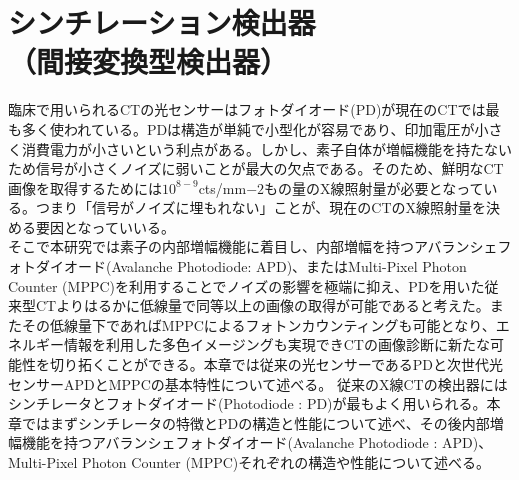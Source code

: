 \chapter{シンチレーション検出器\\（間接変換型検出器）}
臨床で用いられるCTの光センサーはフォトダイオード(PD)が現在のCTでは最も多く使われている。PDは構造が単純で小型化が容易であり、印加電圧が小さく消費電力が小さいという利点がある。しかし、素子自体が増幅機能を持たないため信号が小さくノイズに弱いことが最大の欠点である。そのため、鮮明なCT画像を取得するためには$10^{8-9}$cts/mm$-2$もの量のX線照射量が必要となっている。つまり「信号がノイズに埋もれない」ことが、現在のCTのX線照射量を決める要因となっていいる。\\
そこで本研究では素子の内部増幅機能に着目し、内部増幅を持つアバランシェフォトダイオード(Avalanche Photodiode: APD)、またはMulti-Pixel Photon Counter (MPPC)を利用することでノイズの影響を極端に抑え、PDを用いた従来型CTよりはるかに低線量で同等以上の画像の取得が可能であると考えた。またその低線量下であればMPPCによるフォトンカウンティングも可能となり、エネルギー情報を利用した多色イメージングも実現できCTの画像診断に新たな可能性を切り拓くことができる。本章では従来の光センサーであるPDと次世代光センサーAPDとMPPCの基本特性について述べる。
\fi
従来のX線CTの検出器にはシンチレータとフォトダイオード(Photodiode : PD)が最もよく用いられる。本章ではまずシンチレータの特徴とPDの構造と性能について述べ、その後内部増幅機能を持つアバランシェフォトダイオード(Avalanche Photodiode : APD)、Multi-Pixel Photon Counter (MPPC)それぞれの構造や性能について述べる。

